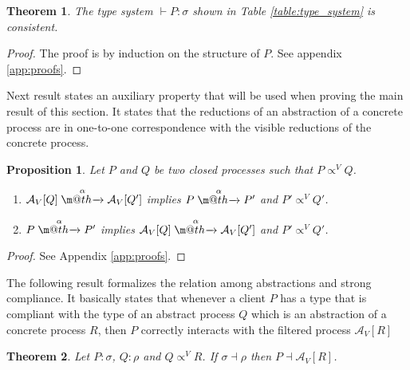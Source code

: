 \documentclass[submission,copyright,creativecommons]{eptcs}
\makeatletter
\newcommand{\tr}[1]{\stackrel{#1}{\rightarrowfill}}
\def \rightarrowfill{\m@th\mathord{\smash-}\mkern-6mu\cleaders\hbox{$\mkern-2mu\mathord{\smash-}\mkern-2mu$}\hfill
  \mkern-6mu\mathord\rightarrow}
\newtheorem{proposition}{Proposition}
\newtheorem{theorem}{Theorem}
\makeatother
\begin{document}
\begin{theorem}\label{thm:consistency}
 The type system $\vdash P:\sigma$ shown in Table \ref{table:type_system} is consistent. 
\end{theorem}

\begin{proof} The proof is by induction on the structure of $P$. See appendix \ref{app:proofs}.  
\end{proof}




Next result states an auxiliary property that will be used when proving the main result of this section. It states that the reductions of an abstraction of a concrete process are in one-to-one correspondence with the visible reductions of the concrete process. 

\begin{proposition} \label{prop:abstractionandreductions} 
 Let $P$ and $Q$ be two closed processes such that $P\propto^V Q$. 
 \begin{enumerate}
  \item $\mathcal{A}_V[Q] \tr{\alpha} \mathcal{A}_V[Q']$ implies $P\tr{\alpha} P'$ and $P'\propto^V Q'$.
  \item $P\tr{\alpha} P'$ implies $\mathcal{A}_V[Q] \tr{\alpha} \mathcal{A}_V[Q']$ and $P'\propto^V Q'$.
 \end{enumerate} 
\end{proposition}

\begin{proof} 
 See Appendix \ref{app:proofs}.
\end{proof}

The following result formalizes the relation among abstractions and strong compliance. It basically states that whenever a client $P$ has a type that is compliant with the type of an abstract process  $Q$ which is an abstraction of a concrete process $R$, then $P$ correctly interacts with the filtered process  $\mathcal{A}_V[R]$

\begin{theorem} 
 Let $P:\sigma$,  $Q:\rho$ and $Q \propto^V R$. If $\sigma\dashv \rho$ then $P \dashv \mathcal{A}_V[R]$. 
\end{theorem}
\end{document}
